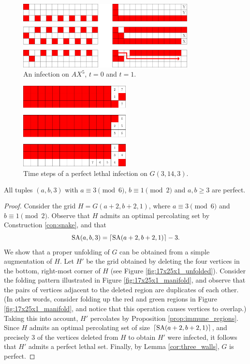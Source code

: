 \begin{figure}[]
\centering
\includegraphics[width=0.8\textwidth]{figures/7/3x13x3.pdf}
\caption{An infection on $AX^5$, $t=0$ and $t=1$.}
\label{fig:3x13x3}
\end{figure} 

\begin{figure}[]
\centering
\includegraphics[width=0.5\textwidth]{figures/7/3x14x3_numbered_heatmap.pdf}
\caption{Time steps of a perfect lethal infection on $G(3,14,3)$.}
\label{fig:3x14x3}
\end{figure} 

\begin{con}
\label{con:3xaxb}
All tuples $(a,b,3)$ with $a \equiv 3 \pmod 6$, $b \equiv 1 \pmod 2$ and $a,b \geq 3$ are perfect. 
\end{con}

\begin{proof}
Consider the grid $H=G(a+2,b+2,1)$, where $a \equiv 3 \pmod 6$ and $b \equiv 1 \pmod 2$. Observe that $H$ admits an optimal percolating set by Construction \ref{con:snake}, and that
$$\text{SA}(a,b,3) = \lceil\text{SA}(a+2,b+2,1)\rceil - 3.$$
We show that a proper unfolding of $G$ can be obtained from a simple augmentation of $H$. Let $H'$ be the grid obtained by deleting the four vertices in the bottom, right-most corner of $H$ (see Figure \ref{fig:17x25x1_unfolded}). Consider the folding pattern illustrated in Figure \ref{fig:17x25x1_manifold}, and observe that the pairs of vertices adjacent to the deleted region are duplicates of each other. (In other words, consider folding up the red and green regions in Figure \ref{fig:17x25x1_manifold}, and notice that this operation causes vertices to overlap.) Taking this into account, $H'$ percolates by Proposition \ref{prop:immune_regions}. Since $H$ admits an optimal percolating set of size $\lceil\text{SA}(a+2,b+2,1)\rceil$, and precisely 3 of the vertices deleted from $H$ to obtain $H'$ were infected, it follows that $H'$ admits a perfect lethal set. Finally, by Lemma \ref{cor:three_walls}, $G$ is perfect.
\end{proof}

